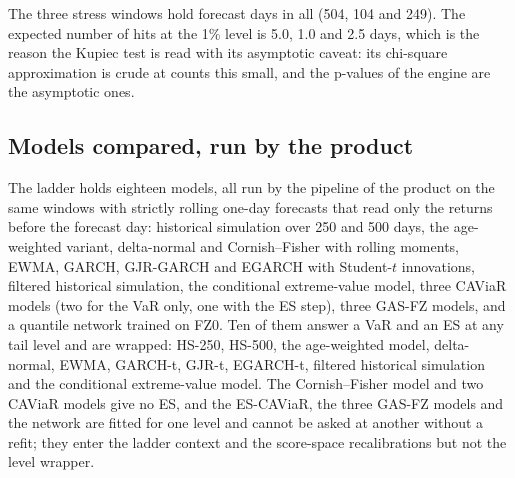 

The three stress windows hold \hypStressDays{} forecast days in all (504, 104 and 249). The expected number of hits at the 1\% level is 5.0, 1.0 and 2.5 days, which is the reason the Kupiec test is read with its asymptotic caveat: its chi-square approximation is crude at counts this small, and the p-values of the engine are the asymptotic ones.

\subsection{Models compared, run by the product}
\label{sec:design-models}

The ladder holds eighteen models, all run by the pipeline of the product on the same windows with strictly rolling one-day forecasts that read only the returns before the forecast day: historical simulation over 250 and 500 days, the age-weighted variant, delta-normal and Cornish--Fisher with rolling moments, EWMA, GARCH, GJR-GARCH and EGARCH with Student-$t$ innovations, filtered historical simulation, the conditional extreme-value model, three CAViaR models (two for the VaR only, one with the ES step), three GAS-FZ models, and a quantile network trained on FZ0. Ten of them answer a VaR and an ES at any tail level and are wrapped: HS-250, HS-500, the age-weighted model, delta-normal, EWMA, GARCH-t, GJR-t, EGARCH-t, filtered historical simulation and the conditional extreme-value model. The Cornish--Fisher model and two CAViaR models give no ES, and the ES-CAViaR, the three GAS-FZ models and the network are fitted for one level and cannot be asked at another without a refit; they enter the ladder context and the score-space recalibrations but not the level wrapper.


